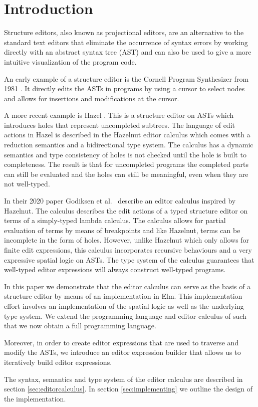 \section{Introduction}
\label{introduction}

Structure editors, also known as projectional editors, are an
alternative to the standard text editors that eliminate the occurrence
of syntax errors by working directly with an abstract syntax tree
(AST) and can also be used to give a more intuitive visualization of
the program code.

An early example of a structure editor is the Cornell Program Synthesizer
from 1981 \cornell. It directly edits the ASTs in programs by using a cursor to
select nodes and allows for insertions and modifications at the cursor. 

A more recent example is Hazel \hazel. This is a structure editor on
ASTs which introduces holes that represent uncompleted subtrees. The
language of edit actions in Hazel is described in the Hazelnut editor
calculus which comes with a reduction semantics and a bidirectional
type system. The calculus has a dynamic semantics and type consistency
of holes is not checked until the hole is built to completeness. The
result is that for uncompleted programs the completed parts can still
be evaluated and the holes can still be meaningful, even when they are
not well-typed.

In their 2020 paper Godiksen et al. \pepm~describe an editor calculus
inspired by Hazelnut. The calculus describes the edit actions of a
typed structure editor on terms of a simply-typed lambda calculus. The
calculus allows for partial evaluation of terms by means of
breakpoints and like Hazelnut, terms can be incomplete in the form of
holes. However, unlike Hazelnut which only allows for finite edit
expressions, this calculus incorporates recursive behaviours and a
very expressive spatial logic on ASTs. The type system of the calculus
guarantees that well-typed editor expressions will always construct
well-typed programs.

In this paper we demonstrate that the editor calculus can serve as the
basis of a structure editor by means of an implementation in
Elm. This implementation effort involves an implementation of the
spatial logic as well as the underlying type system. We extend the
programming language and editor calculus of \pepm such that we now
obtain a full programming language.

Moreover, in order to create editor expressions that are used to
traverse and modify the ASTs, we introduce an editor expression
builder that allows us to iteratively build editor expressions.

The syntax, semantics and type system of the editor calculus are
described in section \ref{sec:editorcalculus}. In section
\ref{sec:implementing} we outline the design of the implementation.


